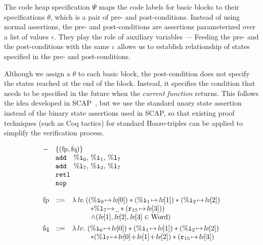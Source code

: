 The code heap specification $\Psi$ maps the code labels
for basic blocks to their specifications $\theta$,
which is a pair of pre- and post-conditions.
Instead of using normal assertions, the pre- and
post-conditions are assertions parameterized over
a list of values $\iota$. They play the role
of auxiliary variables --- Feeding the pre-
and the post-conditions with the same $\iota$ allows
us to establish relationship of states specified
in the pre- and post-conditions.

Although we assign a $\theta$ to each basic block,
the post-condition does not specify the states reached at the end
of the block. Instead, it specifies the condition
that needs to be specified in the future when the
{\em current function} returns. This follows the idea
developed in SCAP~\cite{Feng06pldi}, but we use the
standard unary state assertion instead of the binary
state assertions used in SCAP, so that existing
proof techniques (such as Coq tactics) for standard
Hoare-triples can be applied to simplify the verification
process.

\begin{center}
	\vspace*{-2em}
	$$
	\begin{array}{l}
		\begin{array}{ll}
			- & \{(\text{fp}, \text{fq})\} \\
			& \cadd \quad \ireg{0}, \, \ireg{1}, \, \lreg{7} \\
			& \cadd \quad \lreg{7}, \, \ireg{2}, \, \lreg{7} \\
			& \retl \\
			& \nop
		\end{array} \\
		\\
		\begin{array}{lcl}
			\text{fp} & \define &
			\lambda \, \lv.\,
			((\regst{\ireg{0}}{\lv[0]})
			* (\regst{\ireg{1}}{\lv[1]})
			* (\regst{\ireg{2}}{\lv[2]}) \\
			& &
			\hspace*{6ex} * \regst{\lreg{7}}{\notCare}
						  * (\regst{\reg{15}}{\lv[3]}))
			\\
			& &
			\qquad \ \
			\land
			(\lv[1], \lv[2], \lv[3] \in \TYPE{Word}) \\
			
			\\[-8pt]
			
			\text{fq} & \define & \lambda \, lv. \;
			(\regst{\ireg{0}}{\lv[0]})
			* (\regst{\ireg{1}}{\lv[1]})
			* (\regst{\ireg{2}}{\lv[2]}) \\
			& &
			\hspace*{6ex}
			* (\regst{\lreg{7}}{\lv[0] \!+\! \lv[1] \!+\! \lv[2]})
						  * (\regst{\reg{15}}{\lv[3]})
		\end{array}
	\end{array}
	$$
	\vspace*{-0.5em}
	\label{fig:functionSpec}
\end{center}

